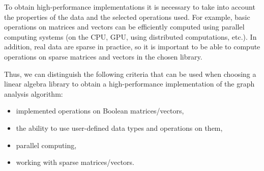  To obtain high-performance implementations it is necessary to take into account the properties of the data and the selected operations used. For example, basic operations on matrices and vectors can be efficiently computed using parallel computing systems (on the CPU, GPU, using distributed computations, etc.). In addition, real data are sparse in practice, so it is important to be able to compute operations on sparse matrices and vectors in the chosen library.
 
 Thus, we can distinguish the following criteria that can be used when choosing a linear algebra library to obtain a high-performance implementation of the graph analysis algorithm:
 
 \begin{itemize}
     \item implemented operations on Boolean matrices/vectors,
     \item the ability to use user-defined data types and operations on them,
     \item parallel computing,
     \item working with sparse matrices/vectors.
 \end{itemize}
 
